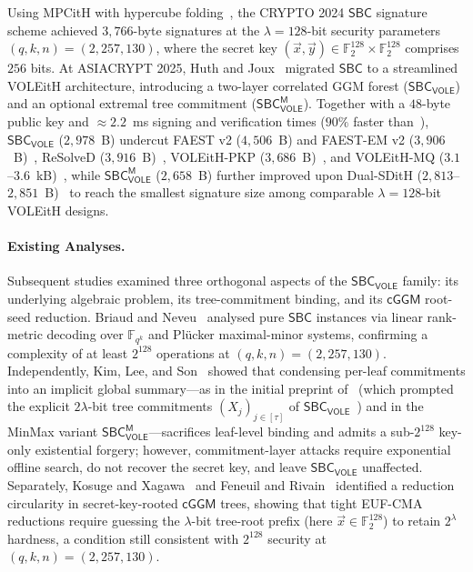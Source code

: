 \documentclass[11pt,a4paper]{article}
\theoremstyle{definition}
\theoremstyle{remark}
\newcommand{\Fqk}{\mathbb{F}_{q^k}}
\newcommand{\Ftwo}{\mathbb{F}_2}
\newcommand{\SBC}{\mathsf{SBC}}
\newcommand{\SBCVOLE}{\mathsf{SBC}_{\mathsf{VOLE}}}
\newcommand{\SBCVOLEM}{\mathsf{SBC}_{\mathsf{VOLE}}^{\mathsf{M}}}
\newcommand{\cGGM}{\mathsf{cGGM}}
\begin{document}
Using MPCitH with hypercube folding~\cite{AGHHJY23}, the CRYPTO 2024 $\SBC$ signature scheme achieved $3{,}766$-byte signatures at the $\lambda = 128$-bit security parameters $(q, k, n) = (2, 257, 130)$, where the secret key $(\vec{x}, \vec{y}) \in \Ftwo^{128} \times \Ftwo^{128}$ comprises $256$ bits. At ASIACRYPT 2025, Huth and Joux~\cite{HJ25} migrated $\SBC$ to a streamlined VOLEitH architecture, introducing a two-layer correlated GGM forest ($\SBCVOLE$) and an optional extremal tree commitment ($\SBCVOLEM$). Together with a $48$-byte public key and $\approx 2.2$~ms signing and verification times ($90\%$ faster than~\cite{HJ24}), $\SBCVOLE$ ($2{,}978$~B) undercut FAEST v2 ($4{,}506$~B) and FAEST-EM v2 ($3{,}906$~B)~\cite{FAEST24}, ReSolveD ($3{,}916$~B)~\cite{CLYYYZ24}, VOLEitH-PKP ($3{,}686$~B)~\cite{BBGK24}, and VOLEitH-MQ ($3.1$--$3.6$~kB)~\cite{Bui24}, while $\SBCVOLEM$ ($2{,}658$~B) further improved upon Dual-SDitH ($2{,}813$--$2{,}851$~B)~\cite{BFGNR24} to reach the smallest signature size among comparable $\lambda = 128$-bit VOLEitH designs.

\paragraph{Existing Analyses.}
Subsequent studies examined three orthogonal aspects of the $\SBCVOLE$ family: its underlying algebraic problem, its tree-commitment binding, and its $\cGGM$ root-seed reduction. Briaud and Neveu~\cite{BN26} analysed pure $\SBC$ instances via linear rank-metric decoding over $\Fqk$ and Pl\"{u}cker maximal-minor systems, confirming a complexity of at least $2^{128}$ operations at $(q, k, n) = (2, 257, 130)$. Independently, Kim, Lee, and Son~\cite{KLS25} showed that condensing per-leaf commitments into an implicit global summary---as in the initial preprint of~\cite{HJ25} (which prompted the explicit $2\lambda$-bit tree commitments $(X_j)_{j \in [\tau]}$ of $\SBCVOLE$~\cite[Section~4]{HJ25}) and in the MinMax variant $\SBCVOLEM$---sacrifices leaf-level binding and admits a sub-$2^{128}$ key-only existential forgery; however, commitment-layer attacks require exponential offline search, do not recover the secret key, and leave $\SBCVOLE$ unaffected. Separately, Kosuge and Xagawa~\cite{KX26} and Feneuil and Rivain~\cite{FR26} identified a reduction circularity in secret-key-rooted $\cGGM$ trees, showing that tight EUF-CMA reductions require guessing the $\lambda$-bit tree-root prefix (here $\vec{x} \in \Ftwo^{128}$) to retain $2^\lambda$ hardness, a condition still consistent with $2^{128}$ security at $(q, k, n) = (2, 257, 130)$.
\end{document}
